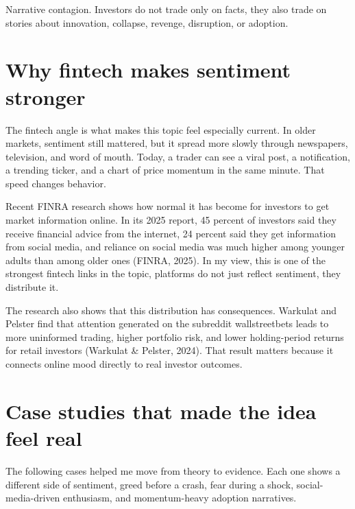 \documentclass[12pt]{article}
\begin{document}
Narrative contagion. Investors do not trade only on facts, they also trade on stories about innovation, collapse, revenge, disruption, or adoption.

\section{Why fintech makes sentiment stronger}

The fintech angle is what makes this topic feel especially current. In older markets, sentiment still mattered, but it spread more slowly through newspapers, television, and word of mouth. Today, a trader can see a viral post, a notification, a trending ticker, and a chart of price momentum in the same minute. That speed changes behavior.

Recent FINRA research shows how normal it has become for investors to get market information online. In its 2025 report, 45 percent of investors said they receive financial advice from the internet, 24 percent said they get information from social media, and reliance on social media was much higher among younger adults than among older ones (FINRA, 2025). In my view, this is one of the strongest fintech links in the topic, platforms do not just reflect sentiment, they distribute it.

The research also shows that this distribution has consequences. Warkulat and Pelster find that attention generated on the subreddit wallstreetbets leads to more uninformed trading, higher portfolio risk, and lower holding-period returns for retail investors (Warkulat \& Pelster, 2024). That result matters because it connects online mood directly to real investor outcomes.

\section{Case studies that made the idea feel real}

The following cases helped me move from theory to evidence. Each one shows a different side of sentiment, greed before a crash, fear during a shock, social-media-driven enthusiasm, and momentum-heavy adoption narratives.
\end{document}
